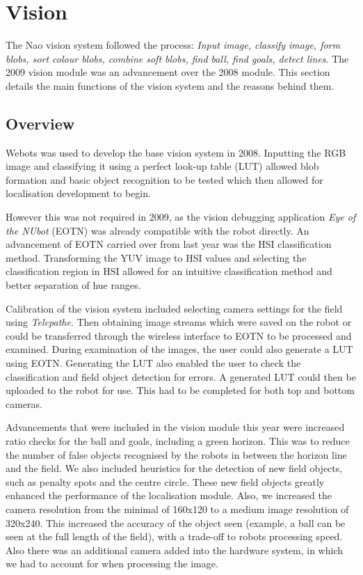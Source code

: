 \section{Vision}
The Nao vision system followed the process: \emph{Input image, classify image, form blobs, sort colour blobs, combine soft blobs, find ball, find goals, detect lines}. The 2009 vision module was an advancement over the 2008 module. This section details the main functions of the vision system and the reasons behind them. 

\subsection{Overview}

Webots was used to develop the base vision system in 2008. Inputting the RGB image and classifying it using a perfect look-up table (LUT) allowed blob formation and basic object recognition to be tested which then allowed for localisation development to begin. 

However this was not required in 2009, as the vision debugging application \emph{Eye of the NUbot} (EOTN) was already compatible with the robot directly. An advancement of EOTN carried over from last year was the HSI classification method. Transforming the YUV image to HSI values and selecting the classification region in HSI allowed for an intuitive classification method and better separation of hue ranges. 

Calibration of the vision system included selecting camera settings for the field using \emph{Telepathe}.
Then obtaining image streams which were saved on the robot or could be transferred through the wireless interface to EOTN to be processed and examined. During examination of the images, the user could also generate a LUT using EOTN. Generating the LUT also enabled the user to check the classification and field object detection for errors. A generated LUT could then be uploaded to the robot for use. This had to be completed for both top and bottom cameras.

Advancements that were included in the vision module this year were increased ratio checks for the ball and goals, including a green horizon. This was to reduce the number of false objects recognised by the robots in between the horizon line and the field. We also included heuristics for the detection of new field objects, such as penalty spots and the centre circle. These new field objects greatly enhanced the performance of the localisation module. Also, we increased the camera resolution from the minimal of 160x120 to a medium image resolution of 320x240. This increased the accuracy of the object seen (example, a ball can be seen at the full length of the field), with a trade-off to robots processing speed. Also there was an additional camera added into the hardware system, in which we had to account for when processing the image.



